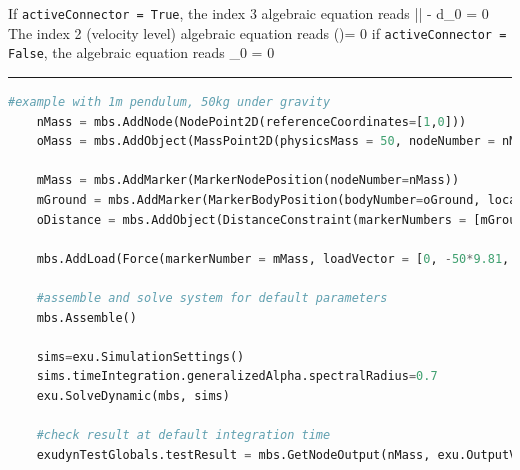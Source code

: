     If \texttt{activeConnector = True}, the index 3 algebraic equation reads
    \be
      \left|\right| - d_0 = 0
    \ee
    The index 2 (velocity level) algebraic equation reads
    \be
      \left(\right)\tp \Delta\vv = 0
    \ee
    if \texttt{activeConnector = False}, the algebraic equation reads
    \be
      \lambda_0 = 0
    \ee
\vspace{6pt}\par\noindent\rule{\textwidth}{0.4pt}
\label{miniExample_ObjectConnectorDistance}
\pythonstyle
\begin{lstlisting}[language=Python, firstnumber=1]
    #example with 1m pendulum, 50kg under gravity
    nMass = mbs.AddNode(NodePoint2D(referenceCoordinates=[1,0]))
    oMass = mbs.AddObject(MassPoint2D(physicsMass = 50, nodeNumber = nMass))
    
    mMass = mbs.AddMarker(MarkerNodePosition(nodeNumber=nMass))
    mGround = mbs.AddMarker(MarkerBodyPosition(bodyNumber=oGround, localPosition = [0,0,0]))
    oDistance = mbs.AddObject(DistanceConstraint(markerNumbers = [mGround, mMass], distance = 1))
    
    mbs.AddLoad(Force(markerNumber = mMass, loadVector = [0, -50*9.81, 0])) 

    #assemble and solve system for default parameters
    mbs.Assemble()
    
    sims=exu.SimulationSettings()
    sims.timeIntegration.generalizedAlpha.spectralRadius=0.7
    exu.SolveDynamic(mbs, sims)

    #check result at default integration time
    exudynTestGlobals.testResult = mbs.GetNodeOutput(nMass, exu.OutputVariableType.Position)[0]

\end{lstlisting}

